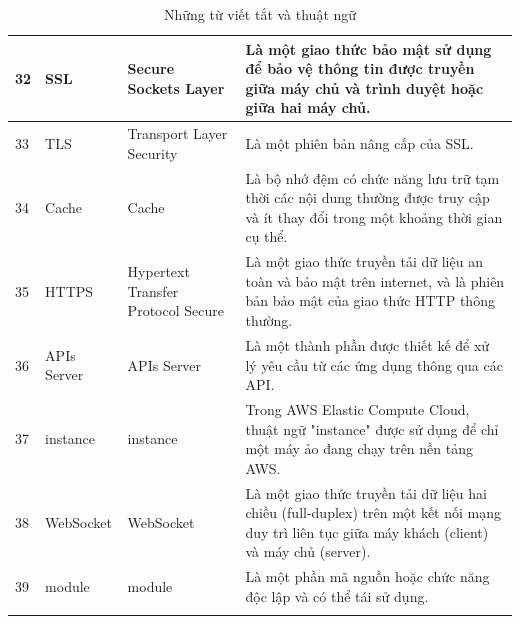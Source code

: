 \begin{center}
\begin{longtable}{|p{1cm}|p{2.75cm}|p{2.75cm}|p{8cm}|}
        \hline
        32 & SSL & Secure Sockets Layer & Là một giao thức bảo mật sử dụng để bảo vệ thông tin được truyền giữa máy chủ và trình duyệt hoặc giữa hai máy chủ. \\ 
        \hline
        33 & TLS & Transport Layer Security & Là một phiên bản nâng cấp của SSL. \\ 
        \hline
        34 & Cache & Cache & Là bộ nhớ đệm có chức năng lưu trữ tạm thời các nội dung thường được truy cập và ít thay đổi trong một khoảng thời gian cụ thể. \\ 
        \hline
        35 & HTTPS & Hypertext Transfer Protocol Secure & Là một giao thức truyền tải dữ liệu an toàn và bảo mật trên internet, và là phiên bản bảo mật của giao thức HTTP thông thường. \\ 
        \hline
        36 & APIs Server & APIs Server & Là một thành phần được thiết kế để xử lý yêu cầu từ các ứng dụng thông qua các API.  \\ 
        \hline
        37 & instance & instance & Trong AWS Elastic Compute Cloud, thuật ngữ "instance" được sử dụng để chỉ một máy ảo đang chạy trên nền tảng AWS. \\ 
        \hline
        38 & WebSocket & WebSocket & Là một giao thức truyền tải dữ liệu hai chiều (full-duplex) trên một kết nối mạng duy trì liên tục giữa máy khách (client) và máy chủ (server). \\
        \hline
        39 & module & module & Là một phần mã nguồn hoặc chức năng độc lập và có thể tái sử dụng. \\
        \hline
        \caption{Những từ viết tắt và thuật ngữ}
    \end{longtable}
\end{center}
